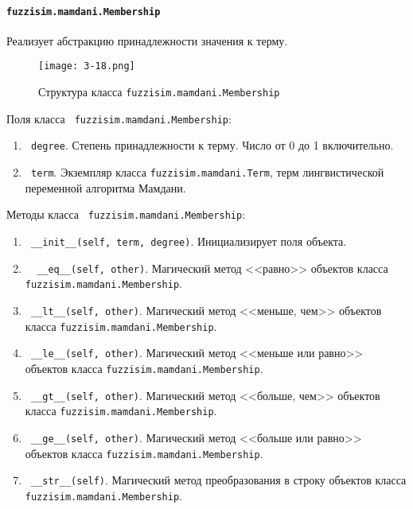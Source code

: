 \paragraph{\lstinline!fuzzisim.mamdani.Membership!}

Реализует абстракцию принадлежности значения к терму.

\begin{figure}[ht]
	\centering
	\texttt{[image: 3-18.png]}
	\caption{ Структура класса  \lstinline!fuzzisim.mamdani.Membership!}
\end{figure}

Поля класса \lstinline! fuzzisim.mamdani.Membership!:
\begin{enumerate}[label=\arabic*)]
	\item \lstinline! degree!. Степень принадлежности к терму. Число от 0 до 1 включительно.
	\item \lstinline! term!.   Экземпляр класса  \lstinline!fuzzisim.mamdani.Term!, терм лингвистической переменной алгоритма Мамдани.
\end{enumerate}


Методы класса \lstinline! fuzzisim.mamdani.Membership!:
\begin{enumerate}[label=\arabic*)]
	\item \lstinline! __init__(self, term, degree)!. Инициализирует поля объекта.
	\item \lstinline!  __eq__(self, other)!. Магический метод <<равно>> объектов класса \lstinline!fuzzisim.mamdani.Membership!.
	\item \lstinline! __lt__(self, other)!. Магический метод <<меньше, чем>> объектов класса \lstinline!fuzzisim.mamdani.Membership!.
	\item \lstinline! __le__(self, other)!. Магический метод <<меньше или равно>> объектов класса \lstinline!fuzzisim.mamdani.Membership!.
	\item \lstinline! __gt__(self, other)!. Магический метод <<больше, чем>> объектов класса \lstinline!fuzzisim.mamdani.Membership!.
	\item \lstinline! __ge__(self, other)!. Магический метод <<больше или равно>> объектов класса \lstinline!fuzzisim.mamdani.Membership!.
	\item \lstinline! __str__(self)!. Магический метод преобразования в строку объектов класса \lstinline!fuzzisim.mamdani.Membership!.
\end{enumerate}







